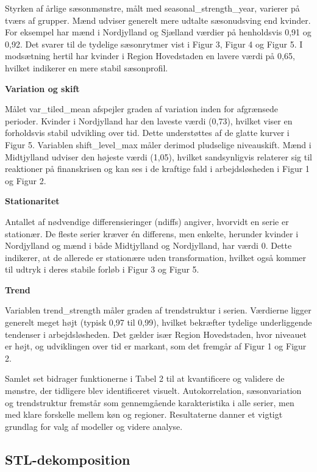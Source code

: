 \documentclass[
]{article}
\begin{document}
Styrken af årlige sæsonmønstre, målt med seasonal\_strength\_year,
varierer på tværs af grupper. Mænd udviser generelt mere udtalte
sæsonudsving end kvinder. For eksempel har mænd i Nordjylland og
Sjælland værdier på henholdsvis 0,91 og 0,92. Det svarer til de tydelige
sæsonrytmer vist i Figur 3, Figur 4 og Figur 5. I modsætning hertil har
kvinder i Region Hovedstaden en lavere værdi på 0,65, hvilket indikerer
en mere stabil sæsonprofil.

\textbf{Variation og skift}

Målet var\_tiled\_mean afspejler graden af variation inden for
afgrænsede perioder. Kvinder i Nordjylland har den laveste værdi (0,73),
hvilket viser en forholdsvis stabil udvikling over tid. Dette
understøttes af de glatte kurver i Figur 5. Variablen shift\_level\_max
måler derimod pludselige niveauskift. Mænd i Midtjylland udviser den
højeste værdi (1,05), hvilket sandsynligvis relaterer sig til reaktioner
på finanskrisen og kan ses i de kraftige fald i arbejdsløsheden i Figur
1 og Figur 2.

\textbf{Stationaritet}

Antallet af nødvendige differensieringer (ndiffs) angiver, hvorvidt en
serie er stationær. De fleste serier kræver én differens, men enkelte,
herunder kvinder i Nordjylland og mænd i både Midtjylland og
Nordjylland, har værdi 0. Dette indikerer, at de allerede er stationære
uden transformation, hvilket også kommer til udtryk i deres stabile
forløb i Figur 3 og Figur 5.

\textbf{Trend}

Variablen trend\_strength måler graden af trendstruktur i serien.
Værdierne ligger generelt meget højt (typisk 0,97 til 0,99), hvilket
bekræfter tydelige underliggende tendenser i arbejdsløsheden. Det gælder
især Region Hovedstaden, hvor niveauet er højt, og udviklingen over tid
er markant, som det fremgår af Figur 1 og Figur 2.

Samlet set bidrager funktionerne i Tabel 2 til at kvantificere og
validere de mønstre, der tidligere blev identificeret visuelt.
Autokorrelation, sæsonvariation og trendstruktur fremstår som
gennemgående karakteristika i alle serier, men med klare forskelle
mellem køn og regioner. Resultaterne danner et vigtigt grundlag for valg
af modeller og videre analyse.

\subsection{STL-dekomposition}\label{stl-dekomposition}
\end{document}
